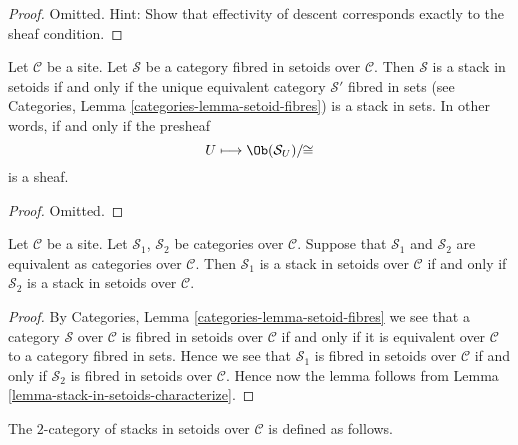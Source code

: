 \begin{proof}
Omitted. Hint: Show that effectivity of descent corresponds exactly to
the sheaf condition.
\end{proof}

\begin{lemma}
\label{lemma-stack-in-setoids-characterize}
Let $\mathcal{C}$ be a site.
Let $\mathcal{S}$ be a category fibred in setoids over $\mathcal{C}$.
Then $\mathcal{S}$ is a stack in setoids if and only if the unique
equivalent category $\mathcal{S}'$ fibred in sets (see
Categories, Lemma \ref{categories-lemma-setoid-fibres})
is a stack in sets. In other words, if and only if the presheaf
$$
U \longmapsto \Ob(\mathcal{S}_U)/\!\!\cong
$$
is a sheaf.
\end{lemma}

\begin{proof}
Omitted.
\end{proof}

\begin{lemma}
\label{lemma-stack-in-setoids-equivalent}
Let $\mathcal{C}$ be a site.
Let $\mathcal{S}_1$, $\mathcal{S}_2$ be categories over $\mathcal{C}$.
Suppose that $\mathcal{S}_1$ and $\mathcal{S}_2$ are equivalent
as categories over $\mathcal{C}$.
Then $\mathcal{S}_1$ is a stack in setoids over $\mathcal{C}$ if and only if
$\mathcal{S}_2$ is a stack in setoids over $\mathcal{C}$.
\end{lemma}

\begin{proof}
By
Categories, Lemma \ref{categories-lemma-setoid-fibres}
we see that a category $\mathcal{S}$ over $\mathcal{C}$ is fibred in setoids
over $\mathcal{C}$ if and only if it is equivalent over $\mathcal{C}$
to a category fibred in sets.
Hence we see that $\mathcal{S}_1$ is fibred in setoids over $\mathcal{C}$
if and only if $\mathcal{S}_2$ is fibred in setoids over $\mathcal{C}$.
Hence now the lemma follows from
Lemma \ref{lemma-stack-in-setoids-characterize}.
\end{proof}

\noindent
The $2$-category of stacks in setoids over $\mathcal{C}$
is defined as follows.

